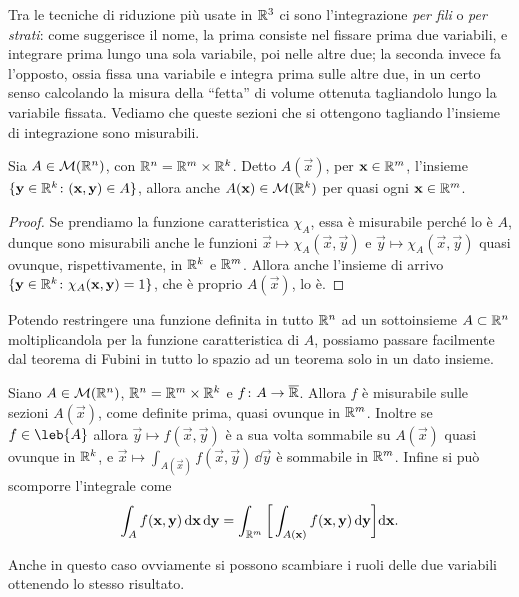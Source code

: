 Tra le tecniche di riduzione più usate in $\mathbb{R}^3$ ci sono l'integrazione \emph{per fili} o \emph{per strati}: come suggerisce il nome, la prima consiste nel fissare prima due variabili, e integrare prima lungo una sola variabile, poi nelle altre due; la seconda invece fa l'opposto, ossia fissa una variabile e integra prima sulle altre due, in un certo senso calcolando la misura della ``fetta'' di volume ottenuta tagliandolo lungo la variabile fissata.
Vediamo che queste sezioni che si ottengono tagliando l'insieme di integrazione sono misurabili.
\begin{lemma} \label{l:sezioni-misurabili}
	Sia $A\in\mathcal M(\mathbb{R}^n)$, con $\mathbb{R}^n=\mathbb{R}^m\times\mathbb{R}^k$.
	Detto $A(\vec x)$, per $\mathbf{x}\in\mathbb{R}^m$, l'insieme $\{\mathbf{y}\in\mathbb{R}^k\colon(\mathbf{x},\mathbf{y})\in A\}$, allora anche $A(\mathbf{x})\in\mathcal M(\mathbb{R}^k)$ per quasi ogni $\mathbf{x}\in\mathbb{R}^m$.
\end{lemma}
\begin{proof}
	Se prendiamo la funzione caratteristica $\chi_A$, essa è misurabile perch\'e lo è $A$, dunque sono misurabili anche le funzioni $\vec x\mapsto\chi_A(\vec x,\vec y)$ e $\vec y\mapsto\chi_A(\vec x,\vec y)$ quasi ovunque, rispettivamente, in $\mathbb{R}^k$ e $\mathbb{R}^m$.
	Allora anche l'insieme di arrivo $\{\mathbf{y}\in\mathbb{R}^k\colon\chi_A(\mathbf{x},\mathbf{y})=1\}$, che è proprio $A(\vec x)$, lo è.
\end{proof}
Potendo restringere una funzione definita in tutto $\mathbb{R}^n$ ad un sottoinsieme $A\subset\mathbb{R}^n$ moltiplicandola per la funzione caratteristica di $A$, possiamo passare facilmente dal teorema di Fubini in tutto lo spazio ad un teorema solo in un dato insieme.
\begin{teorema} \label{t:fubini2}
	Siano $A\in\mathcal M(\mathbb{R}^n)$, $\mathbb{R}^n=\mathbb{R}^m\times\mathbb{R}^k$ e $f\colon A\to\overline{\mathbb{R}}$.
	Allora $f$ è misurabile sulle sezioni $A(\vec x)$, come definite prima, quasi ovunque in $\mathbb{R}^m$.
	Inoltre se $f\in\leb{A}$ allora $\vec y\mapsto f(\vec x,\vec y)$ è a sua volta sommabile su $A(\vec x)$ quasi ovunque in $\mathbb{R}^k$, e $\vec x\mapsto\int_{A(\vec x)}f(\vec x,\vec y)\,\dd\vec y$ è sommabile in $\mathbb{R}^m$.
	Infine si può scomporre l'integrale come
	\begin{equation}
		\int_Af(\mathbf{x},\mathbf{y})\,\textup{d}\mathbf{x}\,\textup{d}\mathbf{y}=\int_{\mathbb{R}^m}\bigg[\int_{A(\mathbf{x})}f(\mathbf{x},\mathbf{y})\,\textup{d}\mathbf{y}\bigg]\textup{d}\mathbf{x}.
	\end{equation}
\end{teorema}
Anche in questo caso ovviamente si possono scambiare i ruoli delle due variabili ottenendo lo stesso risultato.


